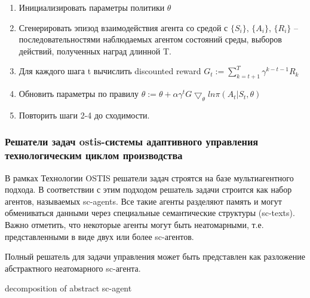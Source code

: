 \begin{enumerate}
    \item Инициализировать параметры политики $\theta$
    \item Сгенерировать эпизод взаимодействия агента со средой с $\{S_i \}$, $\{A_i \}$, $\{R_i \}$   – последовательностями наблюдаемых агентом состояний среды, выборов действий, полученных наград длинной T.
    \item Для каждого шага t вычислить discounted reward $G_t :=  \sum_{k=t+1}^{T}   \gamma ^{k-t-1} R_k  $
    \item Обновить параметры по правилу $\theta :=  \theta + \alpha  \gamma ^t G \bigtriangledown_ \theta  ln \pi (A_t |S_t, \theta )$
    \item Повторить шаги 2-4 до сходимости.


\end{enumerate}


\subsubsection{Решатели задач ostis-системы адаптивного управления технологическим циклом производства}

В рамках Технологии OSTIS решатели задач строятся на базе мультиагентного подхода. В соответствии с этим подходом решатель задачи строится как набор агентов, называемых sc-agents. Все такие агенты разделяют память и могут обмениваться данными через специальные семантические структуры (sc-texts). Важно отметить, что некоторые агенты могут быть неатомарными, т.е. представленными в виде двух или более sc-агентов.

Полный решатель для задачи управления может быть представлен как разложение абстрактного неатомарного sc-агента.


\begin{SCn}
\begin{scnrelfromset}{decomposition of abstract sc-agent}
\end{scnrelfromset}
\end{SCn}

